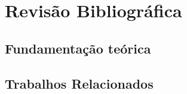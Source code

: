 \chapter{Revisão Bibliográfica} \label{cap:rev}

\section{Fundamentação teórica} 

\section{Trabalhos Relacionados}

